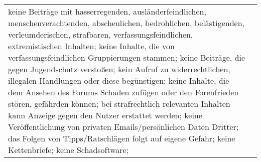 \begin{landscape}
\begin{longtable}{lp{170mm}}
  keine Beiträge mit hasserregenden, ausländerfeindlichen, menschenverachtenden,
  abscheulichen, bedrohlichen, belästigenden, verleumderischen, strafbaren,
  verfassungsfeindlichen, extremistischen Inhalten; keine Inhalte, die von
  verfassungsfeindlichen Gruppierungen stammen; keine Beiträge, die gegen
  Jugendschutz verstoßen; kein Aufruf zu widerrechtlichen, illegalen Handlungen
  oder diese begünstigen; keine Inhalte, die dem Ansehen des Forums Schaden
  zufügen oder den Forenfrieden stören, gefährden können; bei strafrechtlich
  relevanten Inhalten kann Anzeige gegen den Nutzer erstattet werden;  keine
  Veröffentlichung von privaten Emails/persönlichen Daten Dritter; das Folgen
  von Tipps/Ratschlägen folgt auf eigene Gefahr; keine Kettenbriefe; keine
  Schadsoftware;
\end{longtable}
\end{landscape}

